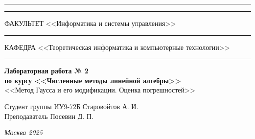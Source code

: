 \documentclass[a4paper, 14pt]{extarticle}
\begin{document}
\begin{titlepage}
\vspace{-25pt}
\hspace{-35pt}\rule{\textwidth}{2.3pt}

\vspace*{-20.3pt}
\hspace{-35pt}\rule{\textwidth}{0.4pt}

\vspace{1.5ex}
\hspace{-35pt} \noindent \small ФАКУЛЬТЕТ\hspace{80pt} <<Информатика и системы управления>>

\vspace*{-16pt}
\hspace{47pt}\rule{0.83\textwidth}{0.4pt}

\vspace{0.5ex}
\hspace{-35pt} \noindent \small КАФЕДРА\hspace{50pt} <<Теоретическая информатика и компьютерные технологии>>

\vspace*{-16pt}
\hspace{30pt}\rule{0.866\textwidth}{0.4pt}

\vspace{11em}

\begin{center}
\Large {\bf Лабораторная работа № 2} \\
\large {\bf по курсу <<Численные методы линейной алгебры>>} \\
\large <<Метод Гаусса и его модификации. Оценка погрешностей>>
\end{center}\normalsize

\vspace{8em}


\begin{flushright}
  {Студент группы ИУ9-72Б Старовойтов А. И. \hspace*{15pt}\\
  \vspace{2ex}
  Преподаватель Посевин Д. П.\hspace*{15pt}}
\end{flushright}

\bigskip

\vfill


\begin{center}
\textsl{Москва 2025}
\end{center}
\end{titlepage}
\end{document}
